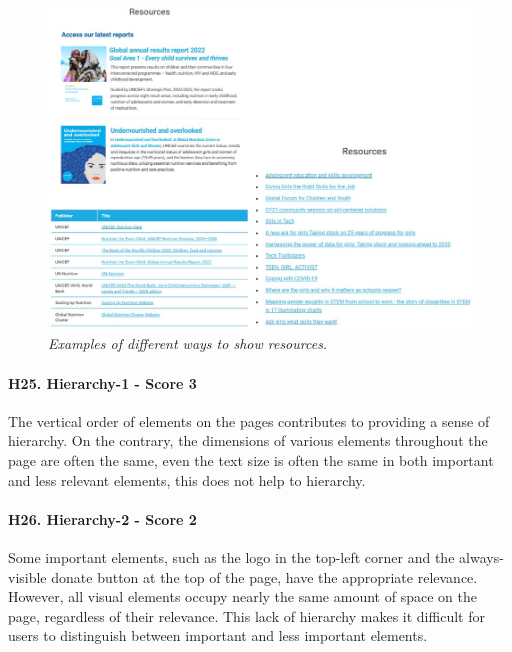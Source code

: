 \begin{figure}[!h]
	\begin{center}
		\includegraphics[width=\textwidth]{FinalScores29.jpg}
		\captionsetup{font=small}
		\caption{\textit{Examples of different ways to show resources.}}
	\end{center}
\end{figure}
\newline
\newline \paragraph{H25. Hierarchy-1 - Score 3}  \label{subsec:H25}	The vertical order of elements on the pages contributes to providing a sense of hierarchy. On the contrary, the dimensions of various elements throughout the page are often the same, even the text size is often the same in both important and less relevant elements, this does not help to hierarchy.
\newline
\newline \paragraph{H26. Hierarchy-2 - Score 2}	\label{subsec:H26} Some important elements, such as the logo in the top-left corner and the always-visible donate button at the top of the page, have the appropriate relevance.
\newline However, all visual elements occupy nearly the same amount of space on the page, regardless of their relevance. This lack of hierarchy makes it difficult for users to distinguish between important and less important elements. 

